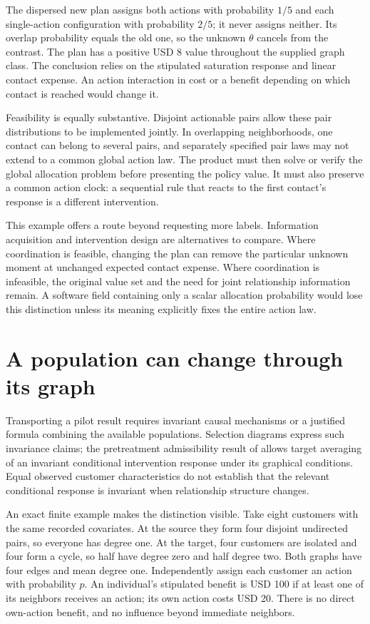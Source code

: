 The dispersed new plan assigns both actions with probability $1/5$ and each
single-action configuration with probability $2/5$; it never assigns neither.
Its overlap probability equals the old one, so the unknown $\theta$ cancels
from the contrast. The plan has a positive USD 8 value throughout the supplied
graph class. The conclusion relies on the stipulated saturation response and
linear contact expense. An action interaction in cost or a benefit depending
on which contact is reached would change it.\citep{exec17_s7_math}

Feasibility is equally substantive. Disjoint actionable pairs allow these
pair distributions to be implemented jointly. In overlapping neighborhoods,
one contact can belong to several pairs, and separately specified pair laws
may not extend to a common global action law. The product must then solve or
verify the global allocation problem before presenting the policy value.
It must also preserve a common action clock: a sequential rule that reacts
to the first contact's response is a different intervention.

This example offers a route beyond requesting more labels. Information
acquisition and intervention design are alternatives to compare. Where
coordination is feasible, changing the plan can remove the particular unknown
moment at unchanged expected contact expense. Where coordination is infeasible,
the original value set and the need for joint relationship information remain.
A software field containing only a scalar allocation probability would lose
this distinction unless its meaning explicitly fixes the entire action law.

\section{A population can change through its graph}
\label{exec17:s7-topology}

Transporting a pilot result requires invariant causal mechanisms or a justified
formula combining the available populations. Selection diagrams express such
invariance claims; the pretreatment admissibility result of
\citet[Theorem 2 and Corollary 1]{pearltransport2014} allows target averaging of
an invariant conditional intervention response under its graphical conditions.
Equal observed customer characteristics do not establish that the relevant
conditional response is invariant when relationship structure changes.

An exact finite example makes the distinction visible. Take eight customers
with the same recorded covariates. At the source they form four disjoint
undirected pairs, so everyone has degree one. At the target, four customers
are isolated and four form a cycle, so half have degree zero and half degree
two. Both graphs have four edges and mean degree one. Independently assign
each customer an action with probability $p$. An individual's stipulated
benefit is USD 100 if at least one of its neighbors receives an action; its
own action costs USD 20. There is no direct own-action benefit, and no
influence beyond immediate neighbors.

